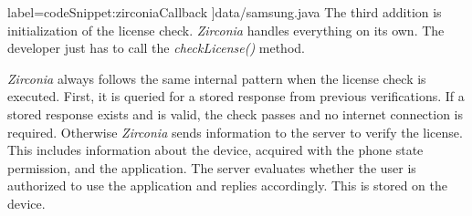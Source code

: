   label={codeSnippet:zirconiaCallback}
]{data/samsung.java}
The third addition is initialization of the license check.
\textit{Zirconia} handles everything on its own.
The developer just has to call the \textit{checkLicense()} method.
\newline

\textit{Zirconia} always follows the same internal pattern when the license check is executed.
First, it is queried for a stored response from previous verifications.
If a stored response exists and is valid, the check passes and no internet connection is required.
Otherwise \textit{Zirconia} sends information to the server to verify the license.
This includes information about the device, acquired with the phone state permission, and the application.
The server evaluates whether the user is authorized to use the application and replies accordingly.
This is stored on the device. \cite{samsungZirconia}
